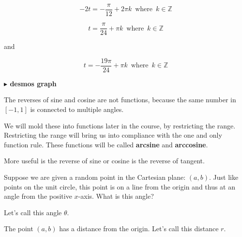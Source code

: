 \documentclass{ximera}
\begin{document}
\begin{example}
\[ 
- 2 t = -\frac{\pi}{12} + 2 \pi k  \, \text{ where } \, k \in \mathbb{Z}
\]


\[ 
t = \frac{\pi}{24} +  \pi k  \, \text{ where } \, k \in \mathbb{Z}
\]


and


\[ 
t = -\frac{19\pi}{24} +  \pi k  \, \text{ where } \, k \in \mathbb{Z}
\]












\textbf{\textcolor{blue!55!black}{$\blacktriangleright$ desmos graph}} 
\begin{center}
\end{center}









\end{example}


















The reverses of sine and cosine are not functions, because the same number in $[-1,1]$ is connected to multiple angles.

We will mold these into functions later in the course, by restricting the range.  Restricting the range will bring us into compliance with the one and only function rule.  These functions will be called \textbf{arcsine} and \textbf{arccosine}.







More useful is the reverse of sine or cosine is the reverse of tangent.


Suppose we are given a random point in the Cartesian plane: $(a,b)$.  Just like points on the unit circle, this point is on a line from the origin and thus at an angle from the positive $x$-axis.  What is this angle?


Let's call this angle $\theta$.

The point $(a,b)$ has a distance from the origin.  Let's call this distance $r$.
\end{document}
